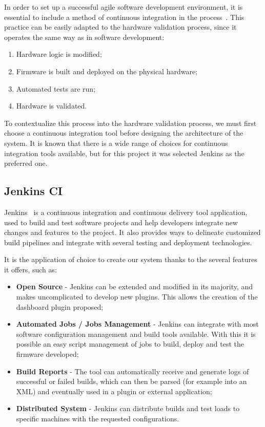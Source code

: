 In order to set up a successful agile software development environment, it is essential to include a method of continuous integration in the process~\cite{Abdul2012}. This practice can be easily adapted to the hardware validation process, since it operates the same way as in software development:
\begin{enumerate}
\item Hardware logic is modified;
\item Firmware is built and deployed on the physical hardware;
\item Automated tests are run;
\item Hardware is validated.\\
\end{enumerate}

To contextualize this process into the hardware validation process, we must first choose a continuous integration tool before designing the architecture of the system.
It is known that there is a wide range of choices for continuous integration tools available, but for this project it was selected Jenkins as the preferred one. 

\subsection{Jenkins CI}\label{jenkins}

Jenkins~\cite{kn:Jenkins} is a continuous integration and continuous delivery tool application, used to build and test software projects and help developers integrate new changes and features to the project. It also provides ways to delineate customized build pipelines and integrate with several testing and deployment technologies.

It is the application of choice to create our system thanks to the several features it offers, such as:

\begin{itemize}
\item \textbf{Open Source} - Jenkins can be extended and modified in its majority, and makes uncomplicated to develop new plugins. This allows the creation of the dashboard plugin proposed;
\item \textbf{Automated Jobs / Jobs Management} - Jenkins can integrate with most software configuration management and build tools available. With this it is possible an easy script management of jobs to build, deploy and test the firmware developed;
\item \textbf{Build Reports} - The tool can automatically receive and generate logs of successful or failed builds, which can then be parsed (for example into an XML) and eventually used in a plugin or external application;
\item \textbf{Distributed System} - Jenkins can distribute builds and test loads to specific machines with the requested configurations.
\end{itemize}

